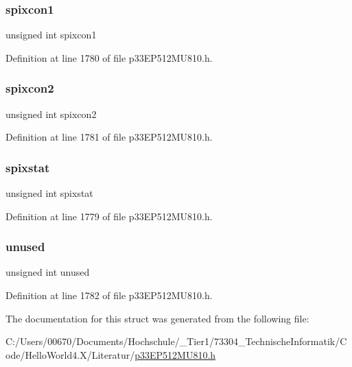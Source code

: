 \mbox{\label{structtag_s_p_i_a91ad3051fa8851d3a39f5178b40b6ca5}} 
\subsubsection{\texorpdfstring{spixcon1}{spixcon1}}
{\footnotesize\ttfamily unsigned int spixcon1}



Definition at line 1780 of file p33\+E\+P512\+M\+U810.\+h.

\mbox{\label{structtag_s_p_i_a2e1664d721667038d3117ae858fc85c4}} 
\subsubsection{\texorpdfstring{spixcon2}{spixcon2}}
{\footnotesize\ttfamily unsigned int spixcon2}



Definition at line 1781 of file p33\+E\+P512\+M\+U810.\+h.

\mbox{\label{structtag_s_p_i_abef89a15a5da0a184b4f3c8605131827}} 
\subsubsection{\texorpdfstring{spixstat}{spixstat}}
{\footnotesize\ttfamily unsigned int spixstat}



Definition at line 1779 of file p33\+E\+P512\+M\+U810.\+h.

\mbox{\label{structtag_s_p_i_a1902ff28c01f8dab73ffed44a642ae6a}} 
\subsubsection{\texorpdfstring{unused}{unused}}
{\footnotesize\ttfamily unsigned int unused}



Definition at line 1782 of file p33\+E\+P512\+M\+U810.\+h.



The documentation for this struct was generated from the following file\+:\begin{DoxyCompactItemize}
\item 
C\+:/\+Users/00670/\+Documents/\+Hochschule/\+\_\+\+Tier1/73304\+\_\+\+Technische\+Informatik/\+Code/\+Hello\+World4.\+X/\+Literatur/\hyperlink{p33_e_p512_m_u810_8h}{p33\+E\+P512\+M\+U810.\+h}\end{DoxyCompactItemize}
